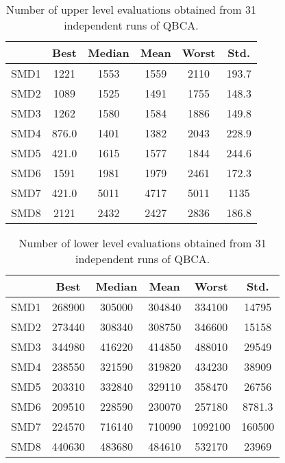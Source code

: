 \documentclass[conference]{IEEEtran}
\theoremstyle{definition}
\begin{document}
\begin{table}[!ht]
    \caption{Number of upper level evaluations obtained from 31 independent runs of QBCA.}
    \label{tab:ul-evals}
    \centering
    \begin{tabular}{cccccc}
        \hline
        & Best &  Median &  Mean &  Worst &  Std. \\ \hline
        SMD1 & 1221 & 1553 & 1559 & 2110 & 193.7 \\ \hline 
        SMD2 & 1089 & 1525 & 1491 & 1755 & 148.3 \\ \hline 
        SMD3 & 1262 & 1580 & 1584 & 1886 & 149.8 \\ \hline 
        SMD4 & 876.0 & 1401 & 1382 & 2043 & 228.9 \\ \hline 
        SMD5 & 421.0 & 1615 & 1577 & 1844 & 244.6 \\ \hline 
        SMD6 & 1591 & 1981 & 1979 & 2461 & 172.3 \\ \hline 
        SMD7 & 421.0 & 5011 & 4717 & 5011 & 1135 \\ \hline 
        SMD8 & 2121 & 2432 & 2427 & 2836 & 186.8 \\ \hline 
    \end{tabular}
\end{table}



\begin{table}[!ht]
    \caption{Number of lower level evaluations obtained from 31 independent runs of QBCA.}
    \label{tab:ll-evals}
    \centering
    \begin{tabular}{cccccc}
        \hline
        & Best &  Median &  Mean &  Worst &  Std. \\ \hline
        SMD1 & 268900 & 305000 & 304840 & 334100 & 14795 \\ \hline 
        SMD2 & 273440 & 308340 & 308750 & 346600 & 15158 \\ \hline 
        SMD3 & 344980 & 416220 & 414850 & 488010 & 29549 \\ \hline 
        SMD4 & 238550 & 321590 & 319820 & 434230 & 38909 \\ \hline 
        SMD5 & 203310 & 332840 & 329110 & 358470 & 26756 \\ \hline 
        SMD6 & 209510 & 228590 & 230070 & 257180 & 8781.3 \\ \hline 
        SMD7 & 224570 & 716140 & 710090 & 1092100 & 160500 \\ \hline 
        SMD8 & 440630 & 483680 & 484610 & 532170 & 23969 \\ \hline 
    \end{tabular}
\end{table}
\end{document}
